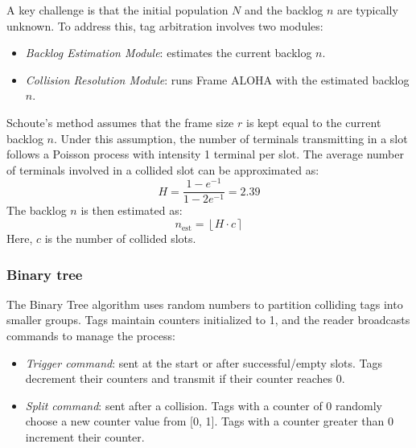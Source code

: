 A key challenge is that the initial population $N$ and the backlog $n$ are typically unknown. 
To address this, tag arbitration involves two modules:
\begin{itemize}
    \item \textit{Backlog Estimation Module}: estimates the current backlog $n$.
    \item \textit{Collision Resolution Module}: runs Frame ALOHA with the estimated backlog $n$.
\end{itemize}
\noindent Schoute's method assumes that the frame size $r$ is kept equal to the current backlog $n$. 
Under this assumption, the number of terminals transmitting in a slot follows a Poisson process with intensity 1 terminal per slot. 
The average number of terminals involved in a collided slot can be approximated as:
\[H=\dfrac{1-e^{-1}}{1-2e^{-1}}=2.39\]
\noindent The backlog $n$ is then estimated as:
\[n_{\text{est}}=\left\lfloor H\cdot c\right\rceil \] 
\noindent Here, $c$ is the number of collided slots.

\subsubsection{Binary tree}
The Binary Tree algorithm uses random numbers to partition colliding tags into smaller groups. 
Tags maintain counters initialized to 1, and the reader broadcasts commands to manage the process:
\begin{itemize}
    \item \textit{Trigger command}: sent at the start or after successful/empty slots. 
        Tags decrement their counters and transmit if their counter reaches 0.
    \item \textit{Split command}: sent after a collision. 
        Tags with a counter of 0 randomly choose a new counter value from [0, 1]. 
        Tags with a counter greater than 0 increment their counter.
\end{itemize}